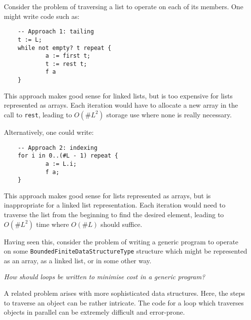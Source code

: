 
Consider the problem of traversing a list
to operate on each of its members.
One might write code such as:

\begin{small}
\begin{verbatim}
    -- Approach 1: tailing
    t := L;
    while not empty? t repeat {
            a := first t;
            t := rest t;
            f a
    }
\end{verbatim}
\end{small}

This approach makes good sense for linked lists,
but is too expensive for lists represented as arrays.
Each iteration would have to allocate a new array in the call to
\verb"rest", leading to $O(\#L^2)$ storage use where none is really necessary.


Alternatively, one could write:

\begin{small}
\begin{verbatim}
    -- Approach 2: indexing
    for i in 0..(#L - 1) repeat {
            a := L.i;
            f a;
    }
\end{verbatim}
\end{small}

This approach makes good sense for lists represented as arrays,
but is inappropriate for a linked list representation.
Each iteration would need to traverse the list from the beginning
to find the desired element,
leading to $O(\#L^2)$ time where $O(\#L)$ should suffice.

Having seen this,
consider the problem of writing a generic program to operate
on some \verb"BoundedFiniteDataStructureType" structure which might be
represented as an array, as a linked list, or in some other way.

{\em How should loops be written to minimise cost in a generic program?}

A related problem arises with more sophisticated data structures.
Here, the steps to traverse an object can be rather intricate.  
The code for a loop which traverses objects in parallel can
be extremely difficult and error-prone.

